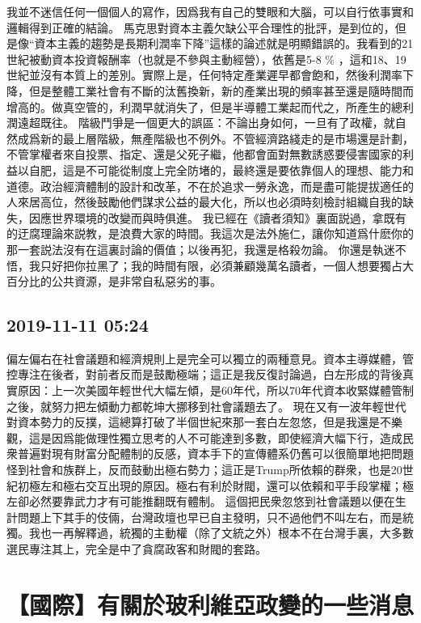 \documentclass[twocolumn]{ctexart}
\begin{document}
我並不迷信任何一個個人的寫作，因爲我有自己的雙眼和大腦，可以自行依事實和邏輯得到正確的結論。 
馬克思對資本主義欠缺公平合理性的批評，是到位的，但是像“資本主義的趨勢是長期利潤率下降”這樣的論述就是明顯錯誤的。我看到的21世紀被動資本投資報酬率（也就是不參與主動經營），依舊是5-8 \% ，這和18、19世紀並沒有本質上的差別。實際上是，任何特定產業遲早都會飽和，然後利潤率下降，但是整體工業社會有不斷的汰舊換新，新的產業出現的頻率甚至還是隨時間而增高的。做真空管的，利潤早就消失了，但是半導體工業起而代之，所產生的總利潤遠超既往。 
階級鬥爭是一個更大的誤區：不論出身如何，一旦有了政權，就自然成爲新的最上層階級，無產階級也不例外。不管經濟路綫走的是市場還是計劃，不管掌權者來自投票、指定、還是父死子繼，他都會面對無數誘惑要侵害國家的利益以自肥，這是不可能從制度上完全防堵的，最終還是要依靠個人的理想、能力和道德。政治經濟體制的設計和改革，不在於追求一勞永逸，而是盡可能提拔適任的人來居高位，然後鼓勵他們謀求公益的最大化，所以也必須時刻檢討組織自我的缺失，因應世界環境的改變而與時俱進。 
我已經在《讀者須知》裏面説過，拿既有的迂腐理論來説教，是浪費大家的時間。我這次是法外施仁，讓你知道爲什麽你的那一套説法沒有在這裏討論的價值；以後再犯，我還是格殺勿論。 
你還是執迷不悟，我只好把你拉黑了；我的時間有限，必須兼顧幾萬名讀者，一個人想要獨占大百分比的公共資源，是非常自私惡劣的事。
\subsection*{2019-11-11 05:24}

偏左偏右在社會議題和經濟規則上是完全可以獨立的兩種意見。資本主導媒體，管控專注在後者，對前者反而是鼓勵極端；這正是我反復討論過，白左形成的背後真實原因：上一次美國年輕世代大幅左傾，是60年代，所以70年代資本收緊媒體管制之後，就努力把左傾動力都乾坤大挪移到社會議題去了。
現在又有一波年輕世代對資本勢力的反撲，這總算打破了半個世紀來那一套白左忽悠，但是我還是不樂觀，這是因爲能做理性獨立思考的人不可能達到多數，即使經濟大幅下行，造成民衆普遍對現有財富分配體制的反感，資本手下的宣傳體系仍舊可以很簡單地把問題怪到社會和族群上，反而鼓動出極右勢力；這正是Trump所依賴的群衆，也是20世紀初極左和極右交互出現的原因。極右有利於財閥，還可以依賴和平手段掌權；極左卻必然要靠武力才有可能推翻既有體制。
這個把民衆忽悠到社會議題以便在生計問題上下其手的伎倆，台灣政壇也早已自主發明，只不過他們不叫左右，而是統獨。我也一再解釋過，統獨的主動權（除了文統之外）根本不在台灣手裏，大多數選民專注其上，完全是中了貪腐政客和財閥的套路。
\section*{【國際】有關於玻利維亞政變的一些消息}
\end{document}
